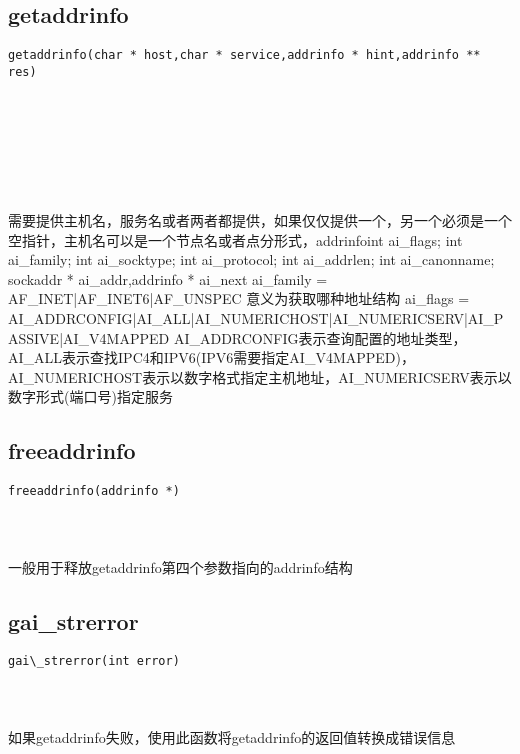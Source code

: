\documentclass[10pt,a4paper]{article}
\begin{document}
\subsection{getaddrinfo}
\begin{spacing}{2.0}
\lstset{language=C,numbers=none}
\begin{lstlisting}
getaddrinfo(char * host,char * service,addrinfo * hint,addrinfo ** res)
\end{lstlisting}
{\large\color[rgb]{0.2,0.4,0.6}{host:}} \\
{\large\color[rgb]{0.2,0.4,0.6}{service:}} \\
{\large\color[rgb]{0.2,0.4,0.6}{hint:}} \\
{\large\color[rgb]{0.2,0.4,0.6}{res:}}
\paragraph{ \ \ }需要提供主机名，服务名或者两者都提供，如果仅仅提供一个，另一个必须是一个空指针，主机名可以是一个节点名或者点分形式，addrinfo{int ai\_flags; int ai\_family; int ai\_socktype; int ai\_protocol; int ai\_addrlen; int ai\_canonname; sockaddr * ai\_addr,addrinfo * ai\_next} ai\_family = AF\_INET|AF\_INET6|AF\_UNSPEC 意义为获取哪种地址结构 ai\_flags = AI\_ADDRCONFIG|AI\_ALL|AI\_NUMERICHOST|AI\_NUMERICSERV|AI\_PASSIVE|AI\_V4MAPPED  AI\_ADDRCONFIG表示查询配置的地址类型，AI\_ALL表示查找IPC4和IPV6(IPV6需要指定AI\_V4MAPPED)，AI\_NUMERICHOST表示以数字格式指定主机地址，AI\_NUMERICSERV表示以数字形式(端口号)指定服务
\end{spacing}

\subsection{freeaddrinfo}
\begin{spacing}{2.0}
\lstset{language=C,numbers=none}
\begin{lstlisting}
freeaddrinfo(addrinfo *)
\end{lstlisting}
{\large\color[rgb]{0.2,0.4,0.6}{*:}}
\paragraph{ \ \ }一般用于释放getaddrinfo第四个参数指向的addrinfo结构
\end{spacing}

\subsection{gai\_strerror}
\begin{spacing}{2.0}
\lstset{language=C,numbers=none}
\begin{lstlisting}
gai\_strerror(int error)
\end{lstlisting}
{\large\color[rgb]{0.2,0.4,0.6}{error:}}
\paragraph{ \ \ }如果getaddrinfo失败，使用此函数将getaddrinfo的返回值转换成错误信息
\end{spacing}
\end{document}
